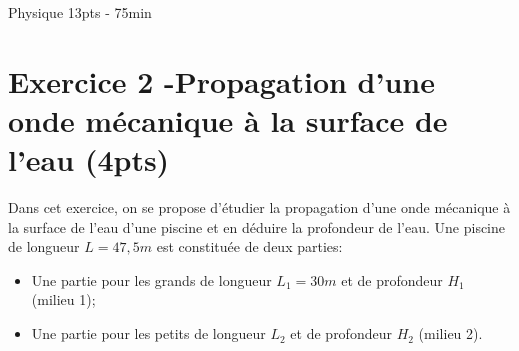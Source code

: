 \documentclass[12pt]{article}
\begin{document}


\newpage
\begin{center}
\hrulefill
\Large{Physique 13pts - 75min}
\hrulefill\\
\end{center}

\section*{Exercice 2 -Propagation d’une onde mécanique à la surface de l’eau \dotfill(4pts)}


Dans cet exercice, on se propose d’étudier la propagation d’une onde mécanique à la surface de l’eau d’une
piscine et en déduire la profondeur de l’eau.
Une piscine de longueur $L=47,5m$ est constituée de deux parties:

\begin{itemize}
  \item Une partie pour les grands de longueur $L_1 =30m$ et de profondeur $H_1$ (milieu 1);
  \item Une partie pour les petits de longueur $L_2$ et de
profondeur $H_2$ (milieu 2).
\end{itemize}
\end{document}
